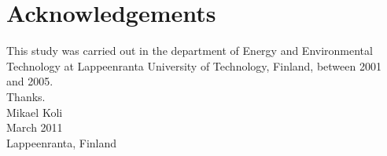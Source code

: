 \section*{Acknowledgements}

This study was carried out in the department of Energy and
Environmental Technology at Lappeenranta University of Technology,
Finland, between 2001 and 2005.\\

Thanks.\\

Mikael Koli\\
March 2011\\
Lappeenranta, Finland\\
